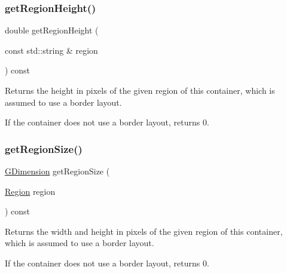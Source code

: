 \subsubsection{\texorpdfstring{get\+Region\+Height()}{getRegionHeight()}\hspace{0.1cm}{\footnotesize\ttfamily [2/2]}}
{\footnotesize\ttfamily double get\+Region\+Height (\begin{DoxyParamCaption}\item[{const std\+::string \&}]{region }\end{DoxyParamCaption}) const\hspace{0.3cm}{\ttfamily [virtual]}}



Returns the height in pixels of the given region of this container, which is assumed to use a border layout. 

If the container does not use a border layout, returns 0. \mbox{\label{classsgl_1_1GContainer_a3b5db9ffbd4b32260f80634f162dba4e}} 
\subsubsection{\texorpdfstring{get\+Region\+Size()}{getRegionSize()}\hspace{0.1cm}{\footnotesize\ttfamily [1/2]}}
{\footnotesize\ttfamily \mbox{\hyperlink{structsgl_1_1GDimension}{G\+Dimension}} get\+Region\+Size (\begin{DoxyParamCaption}\item[{\mbox{\hyperlink{classsgl_1_1GContainer_a81a01a86de31071a92e6cce0bab9bc4b}{Region}}}]{region }\end{DoxyParamCaption}) const\hspace{0.3cm}{\ttfamily [virtual]}}



Returns the width and height in pixels of the given region of this container, which is assumed to use a border layout. 

If the container does not use a border layout, returns 0. \mbox{\label{classsgl_1_1GContainer_a68b18b38b72cb8779fca0c3882549a6b}} 

